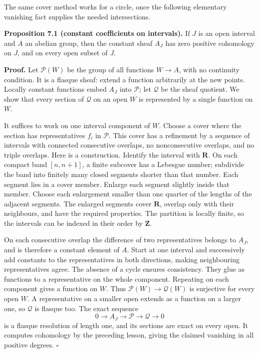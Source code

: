 \documentclass[11pt]{article}
\begin{document}
The same cover method works for a circle, once the following elementary
vanishing fact supplies the needed intersections.

\textbf{Proposition 7.1 (constant coefficients on intervals).} If \(J\)
is an open interval and \(A\) an abelian group, then the constant sheaf
\(A_J\) has zero positive cohomology on \(J\), and on every open subset
of \(J\).

\textbf{Proof.} Let \(\mathcal P(W)\) be the group of all functions
\(W\to A\), with no continuity condition. It is a flasque sheaf: extend
a function arbitrarily at the new points. Locally constant functions
embed \(A_J\) into \(\mathcal P\); let \(\mathcal Q\) be the sheaf
quotient. We show that every section of \(\mathcal Q\) on an open \(W\)
is represented by a single function on \(W\).

It suffices to work on one interval component of \(W\). Choose a cover
where the section has representatives \(f_i\) in \(\mathcal P\). This
cover has a refinement by a sequence of intervals with connected
consecutive overlaps, no nonconsecutive overlaps, and no triple
overlaps. Here is a construction. Identify the interval with
\(\mathbf R\). On each compact band \([n,n+1]\), a finite subcover has a
Lebesgue number; subdivide the band into finitely many closed segments
shorter than that number. Each segment lies in a cover member. Enlarge
each segment slightly inside that member. Choose each enlargement
smaller than one quarter of the lengths of the adjacent segments. The
enlarged segments cover \(\mathbf R\), overlap only with their
neighbours, and have the required properties. The partition is locally
finite, so the intervals can be indexed in their order by \(\mathbf Z\).

On each consecutive overlap the difference of two representatives
belongs to \(A_J\), and is therefore a constant element of \(A\). Start
at one interval and successively add constants to the representatives in
both directions, making neighbouring representatives agree. The absence
of a cycle ensures consistency. They glue as functions to a
representative on the whole component. Repeating on each component gives
a function on \(W\). Thus \(\mathcal P(W)\to\mathcal Q(W)\) is
surjective for every open \(W\). A representative on a smaller open
extends as a function on a larger one, so \(\mathcal Q\) is flasque too.
The exact sequence \[
0\to A_J\to\mathcal P\to\mathcal Q\to0
\] is a flasque resolution of length one, and its sections are exact on
every open. It computes cohomology by the preceding lesson, giving the
claimed vanishing in all positive degrees. \(\square\)
\end{document}
